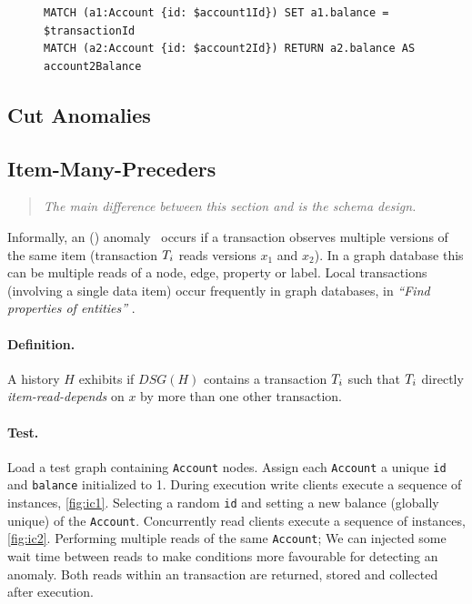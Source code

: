 \begin{figure}[htb]
\begin{lstlisting}[language=cypher,label=fig:cif1,caption=\tx{G1c $T_\mathrm{RW}$}.]
MATCH (a1:Account {id: $account1Id}) SET a1.balance = $transactionId
MATCH (a2:Account {id: $account2Id}) RETURN a2.balance AS account2Balance
\end{lstlisting}
\end{figure}

\subsection{Cut Anomalies}

\subsection*{Item-Many-Preceders}
\label{sec:cut-anomalies}

\begin{quote}
  \textit{The main difference between this section and \ldbcsnb\xspace
          is the schema design.
  }
\end{quote}

Informally, an  () 
anomaly~\cite{DBLP:journals/pvldb/BailisDFGHS13} occurs if a transaction observes 
multiple versions of the same item (\eg transaction $T_i$ reads versions 
$x_1$ and $x_2$). In a graph database this can be multiple reads of a node, edge, 
property or label. Local transactions (involving a single data item) occur 
frequently in graph databases, \eg in \emph{``Find properties of entities''} 
.

\paragraph{Definition.}
A history $H$ exhibits  if $\textit{DSG}(H)$ contains a transaction
$T_i$ such that $T_i$ directly \emph{item-read-depends} on $x$ by more
than one other transaction.

\paragraph{Test.}
Load a test graph containing \texttt{Account} nodes. Assign each \texttt{Account} 
a unique \texttt{id} and \texttt{balance} initialized to 1. During execution 
write clients execute a sequence of  instances, \autoref{fig:ic1}.
Selecting a random \texttt{id} and setting a new balance (globally unique) of the 
\texttt{Account}. Concurrently read clients execute a sequence of  
instances, \autoref{fig:ic2}. Performing multiple reads of the same \texttt{Account}; 
We can injected some wait time between reads to make conditions more favourable 
for detecting an anomaly. Both reads within an  
transaction are returned, stored and collected after execution.

